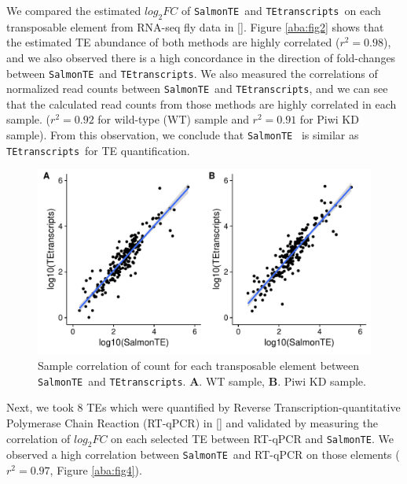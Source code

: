 \documentclass[wsdraft]{ws-procs11x85}
\newcommand{\TEtranscripts}{\texttt{TEtranscripts}}
\newcommand{\SalmonTE}{\texttt{SalmonTE}}
\begin{document}
We compared the estimated $log_{2}FC$ of \SalmonTE~and \TEtranscripts~on each transposable element from 
RNA-seq fly data in [].
Figure \ref{aba:fig2} shows that the estimated TE abundance of both methods are highly correlated ($r^{2}=0.98$), and we also observed there is a high concordance in the direction of fold-changes between \SalmonTE~and \TEtranscripts. We also measured the correlations of normalized read counts between \SalmonTE~and \TEtranscripts, 
and we can see that the calculated read counts from those methods are highly correlated in each sample. ($r^2=0.92$ for wild-type (WT) sample and $r^2=0.91$ for Piwi KD sample).
From this observation, we conclude that \SalmonTE~ is similar as  \TEtranscripts~for TE quantification.
% 
% 
% 
%
\begin{figure}[h]
\centerline{
\includegraphics[width=13cm]{figure_corr_count}
}
\caption{Sample correlation of count for each transposable element between \SalmonTE~and \TEtranscripts. \textbf{A}. WT sample, \textbf{B}. Piwi KD sample.}
\label{aba:fig3}
\end{figure}

Next, we took 8 TEs which were quantified by
Reverse Transcription-quantitative Polymerase Chain Reaction (RT-qPCR) in []
and validated by measuring the correlation of $log_{2}FC$ on each selected TE between RT-qPCR and \SalmonTE.
We observed a high correlation between \SalmonTE~and RT-qPCR on those elements ($r^2=0.97$, Figure \ref{aba:fig4}). 
\end{document}
